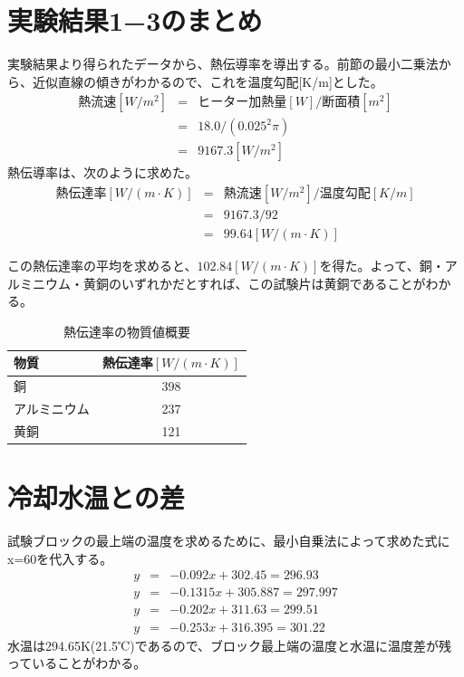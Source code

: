 \documentclass[a4j,twoside,openright,11pt]{jarticle}
\begin{document}
\section{実験結果1−3のまとめ}
実験結果より得られたデータから、熱伝導率を導出する。前節の最小二乗法から、近似直線の傾きがわかるので、これを温度勾配[K/m]とした。
\begin{eqnarray}
熱流速[W/m^2] &=& ヒーター加熱量[W] /　断面積[m^2]\nonumber\\
              &=& 18.0/(0.025^2\pi)\nonumber\\
              &=& 9167.3[W/m^2]
\end{eqnarray}
熱伝導率は、次のように求めた。
\begin{eqnarray}
熱伝達率[W/(m\cdot K)] &=& 熱流速[W/m^2] / 温度勾配[K/m]\nonumber\\
                       &=& 9167.3/92\nonumber\\
                       &=& 99.64[W/(m\cdot K)]
\end{eqnarray}

この熱伝達率の平均を求めると、$102.84[W/(m\cdot K)]$を得た。よって、銅・アルミニウム・黄銅のいずれかだとすれば、この試験片は黄銅であることがわかる。

\begin{table}[htb]
\begin{center}
  \caption{熱伝達率の物質値概要}
  \begin{tabular}{lc}
    物質&熱伝達率$[W/(m\cdot K)]$\\
\hline
    銅&398\\
    アルミニウム&237\\
    黄銅&121\\
\hline
  \end{tabular}
\end{center}
\end{table}

\section{冷却水温との差}

試験ブロックの最上端の温度を求めるために、最小自乗法によって求めた式にx=60を代入する。
\begin{eqnarray}
y&=&-0.092x+302.45 = 296.93\\
y&=&-0.1315x+305.887 = 297.997\\
y&=&-0.202x+311.63 = 299.51\\
y&=&-0.253x+316.395 = 301.22
\end{eqnarray}
水温は294.65K(21.5℃)であるので、ブロック最上端の温度と水温に温度差が残っていることがわかる。
\end{document}
